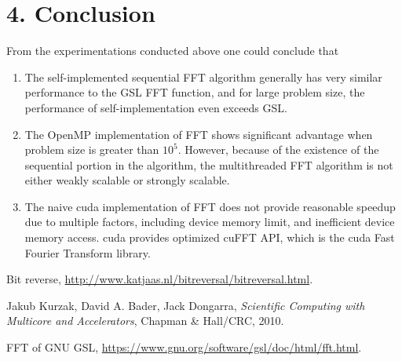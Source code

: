 \documentclass[amsmath,amssymb]{revtex4}
\begin{document}
\section{\label{sec:sec4}4. Conclusion}
From the experimentations conducted above one could conclude that
\begin{enumerate}
\item The self-implemented sequential FFT algorithm generally has very similar performance to the GSL FFT function, and for large problem size, the performance of self-implementation even exceeds GSL.
\item The OpenMP implementation of FFT shows significant advantage when problem size is greater than $10^5$. However, because of the existence of the sequential portion in the algorithm, the multithreaded FFT algorithm is not either weakly scalable or strongly scalable.
\item The naive cuda implementation of FFT does not provide reasonable speedup due to multiple factors, including device memory limit, and inefficient device memory access. cuda provides optimized cuFFT API, which is the cuda Fast Fourier Transform library.
\end{enumerate}


\medskip

\begin{thebibliography}{9}

Bit reverse, \url{http://www.katjaas.nl/bitreversal/bitreversal.html}.

Jakub Kurzak, David A. Bader, Jack Dongarra, \textit{Scientific Computing with Multicore and Accelerators}, Chapman \& Hall/CRC, 2010.


FFT of GNU GSL, \url{https://www.gnu.org/software/gsl/doc/html/fft.html}.

\end{thebibliography}
\end{document}
